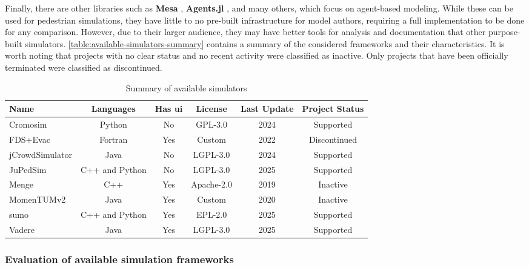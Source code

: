 \documentclass[twoside, 11pt]{article}
\begin{document}
Finally, there are other libraries such as \textbf{Mesa} \cite{hoevenMesa3Agentbased2025}, \textbf{Agents.jl} \cite{Agents.jl}, and many others, which focus on agent-based modeling. While these can be used for pedestrian simulations, they have little to no pre-built infrastructure for model authors, requiring a full implementation to be done for any comparison. However, due to their larger audience, they may have better tools for analysis and documentation that other purpose-built simulators. \autoref{table:available-simulators-summary} contains a summary of the considered frameworks and their characteristics. It is worth noting that projects with no clear status and no recent activity were classified as inactive. Only projects that have been officially terminated were classified as discontinued.

\begin{center}
  \begin{table}[h]
    \begin{tabularx}{\textwidth}{ | X | c | c | c | c | c | } 
      \hline
      Name & Languages & Has \gls{ui} & License & Last Update & Project Status \\ 
      \hline
      Cromosim & Python & No & GPL-3.0 & 2024 & Supported\\
      \hline
      FDS+Evac & Fortran & Yes & Custom & 2022 & Discontinued \\
      \hline
      jCrowdSimulator & Java & No & LGPL-3.0 & 2024 & Supported \\
      \hline
      JuPedSim & C++ and Python & No & LGPL-3.0 & 2025 & Supported \\
      \hline
      Menge & C++ & Yes & Apache-2.0 & 2019 & Inactive \\
      \hline 
      MomenTUMv2 & Java & Yes & Custom & 2020 & Inactive \\
      \hline 
      \gls{sumo} & C++ and Python & Yes & EPL-2.0 & 2025 & Supported \\
      \hline 
      Vadere & Java & Yes & LGPL-3.0 & 2025 & Supported \\
      \hline 

    \end{tabularx}
    \caption{Summary of available simulators}
    \label{table:available-simulators-summary}
  \end{table}
\end{center}

\subsubsection{Evaluation of available simulation frameworks}
\end{document}
